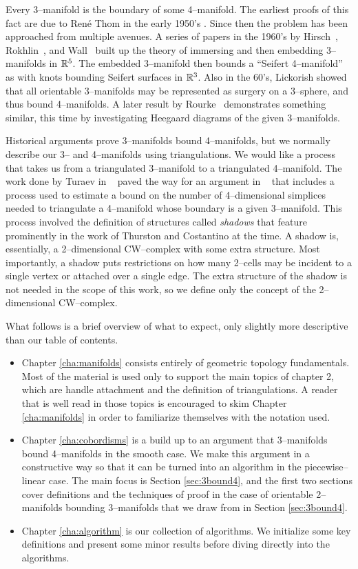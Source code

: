 Every 3--manifold is the boundary of some 4--manifold.
The earliest proofs of this fact are due to Ren\'e Thom in the early 1950's \cite{Thom}.
Since then the problem has been approached from multiple avenues.
A series of papers in the 1960's by Hirsch~\cite{Hirsch61}, Rokhlin~\cite{Rokhlin65}, and Wall~\cite{Wall65} built up the theory of immersing and then embedding 3--manifolds in $\mathbb{R}^5$.
The embedded 3--manifold then bounds a ``Seifert 4--manifold'' as with knots bounding Seifert surfaces in $\mathbb{R}^3$.
Also in the 60's, Lickorish showed that all orientable 3--manifolds may be represented as surgery on a 3--sphere, and thus bound 4--manifolds.
A later result by Rourke~\cite{Rourke85} demonstrates something similar, this time by investigating Heegaard diagrams of the given 3--manifolds.

Historical arguments prove 3--manifolds bound 4--manifolds, but we normally describe our 3-- and 4--manifolds using triangulations.
We would like a process that takes us from a triangulated 3--manifold to a triangulated 4--manifold.
The work done by Turaev in ~\cite{Turaev91} paved the way for an argument in ~\cite{CostThur08} that includes a process used to estimate a bound on the number of 4--dimensional simplices needed to triangulate a 4--manifold whose boundary is a given 3--manifold.
This process involved the definition of structures called \emph{shadows} that feature prominently in the work of Thurston and Costantino at the time.
A shadow is, essentially, a 2--dimensional CW--complex with some extra structure.
Most importantly, a shadow puts restrictions on how many 2--cells may be incident to a single vertex or attached over a single edge.
The extra structure of the shadow is not needed in the scope of this work, so we define only the concept of the 2--dimensional CW--complex.

What follows is a brief overview of what to expect, only slightly more descriptive than our table of contents.
\begin{itemize}
	\item Chapter \ref{cha:manifolds} consists entirely of geometric topology fundamentals.
	Most of the material is used only to support the main topics of chapter 2, which are handle attachment and the definition of triangulations.
	A reader that is well read in those topics is encouraged to skim Chapter \ref{cha:manifolds} in order to familiarize themselves with the notation used.
	\item Chapter \ref{cha:cobordisms} is a build up to an argument that 3--manifolds bound 4--manifolds in the smooth case.
	We make this argument in a constructive way so that it can be turned into an algorithm in the piecewise--linear case.
	The main focus is Section \ref{sec:3bound4}, and the first two sections cover definitions and the techniques of proof in the case of orientable 2--manifolds bounding 3--manifolds that we draw from in Section \ref{sec:3bound4}.
	\item Chapter \ref{cha:algorithm} is our collection of algorithms.
	We initialize some key definitions and present some minor results before diving directly into the algorithms.
\end{itemize}